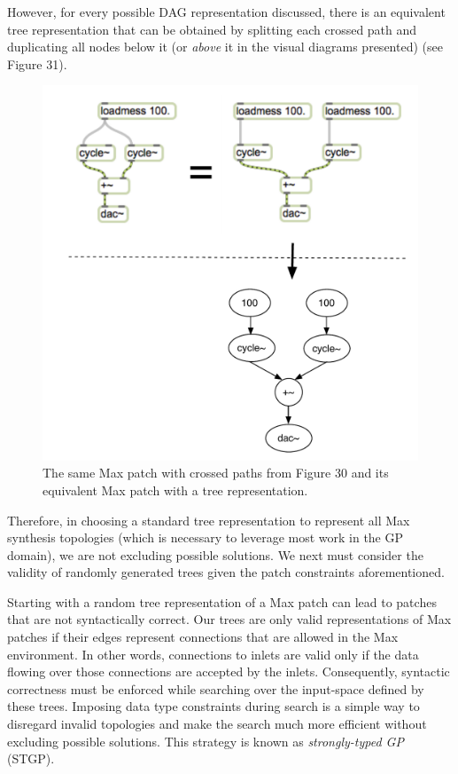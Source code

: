 \documentclass[12pt]{report} 	%
\numberwithin{figure}{chapter}
\numberwithin{table}{chapter}
\numberwithin{equation}{chapter}
\begin{document}
\begin{flushleft}
However, for every possible DAG representation discussed, there is an equivalent tree representation that can be obtained by splitting each crossed path and duplicating all nodes below it (or \textit{above} it in the visual diagrams presented) (see Figure 31).
\begin{figure}[h!]
\begin{center}
\includegraphics[scale=0.8]{MaxDAGsCrossedPaths2}
\caption[Uncrossing paths to form a tree]{The same Max patch with crossed paths from Figure 30 and its equivalent Max patch with a tree representation.}
\end{center}
\end{figure}

Therefore, in choosing a standard tree representation to represent all Max synthesis topologies (which is necessary to leverage most work in the GP domain), we are not excluding possible solutions. We next must consider the validity of randomly generated trees given the patch constraints aforementioned.

Starting with a random tree representation of a Max patch can lead to patches that are not syntactically correct. Our trees are only valid representations of Max patches if their edges represent connections that are allowed in the Max environment. In other words, connections to inlets are valid only if the data flowing over those connections are accepted by the inlets. Consequently, syntactic correctness must be enforced while searching over the input-space defined by these trees. Imposing data type constraints during search is a simple way to disregard invalid topologies and make the search much more efficient without excluding possible solutions. This strategy is known as \textit{strongly-typed GP} (STGP). 


\end{flushleft}
\end{document}
